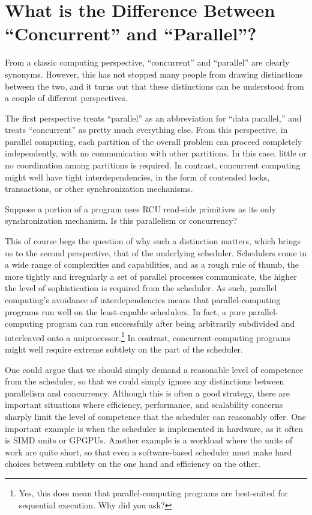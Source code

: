 
\section{What is the Difference Between ``Concurrent'' and ``Parallel''?}
\label{sec:app:questions:What is the Difference Between ``Concurrent'' and ``Parallel''?}

From a classic computing perspective, ``concurrent'' and ``parallel''
are clearly synonyms.
However, this has not stopped many people from drawing distinctions
between the two, and it turns out that these distinctions can be
understood from a couple of different perspectives.

The first perspective treats ``parallel'' as an abbreviation for
``data parallel,'' and treats ``concurrent'' as pretty much everything
else.
From this perspective, in parallel computing, each partition of the
overall problem can proceed completely independently, with no
communication with other partitions.
In this case, little or no coordination among partitions is required.
In contrast, concurrent computing might well have tight interdependencies,
in the form of contended locks, transactions, or other synchronization
mechanisms.

\QuickQuiz{}
	Suppose a portion of a program uses RCU read-side primitives
	as its only synchronization mechanism.
	Is this parallelism or concurrency?
 \QuickQuizEnd

This of course begs the question of why such a distinction matters,
which brings us to the second perspective, that of the underlying scheduler.
Schedulers come in a wide range of complexities and capabilities, and
as a rough rule of thumb, the more tightly and irregularly a set of
parallel processes communicate, the higher the level of sophistication
is required from the scheduler.
As such, parallel computing's avoidance of interdependencies means that
parallel-computing programs run well on the least-capable schedulers.
In fact, a pure parallel-computing program can run successfully after
being arbitrarily subdivided and interleaved onto a uniprocessor.\footnote{
	Yes, this does mean that parallel-computing programs are
	best-suited for sequential execution.
	Why did you ask?}
In contrast, concurrent-computing programs might well require extreme
subtlety on the part of the scheduler.

One could argue that we should simply demand a reasonable level of
competence from the scheduler, so that we could simply ignore any
distinctions between parallelism and concurrency.
Although this is often a good strategy,
there are important situations where efficiency,
performance, and scalability concerns sharply limit the level
of competence that the scheduler can reasonably offer.
One important example is when the scheduler is implemented in
hardware, as it often is SIMD units or GPGPUs.
Another example is a workload where the units of work are quite
short, so that even a software-based scheduler must make hard choices
between subtlety on the one hand and efficiency on the other.

